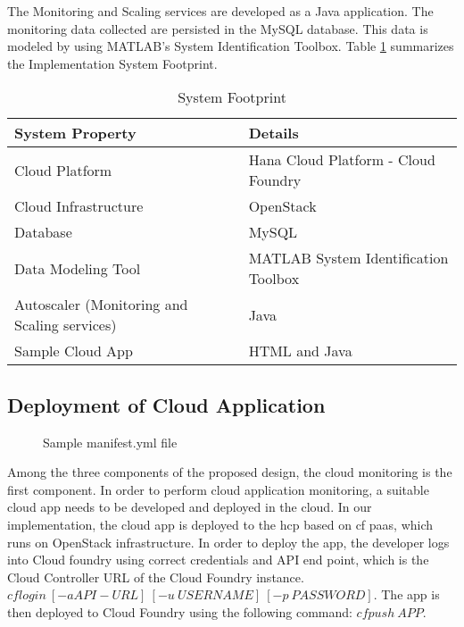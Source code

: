 \documentclass[article,type=msc,colorback,12pt,accentcolor=tud8b,table]{tudthesis}
\begin{document}
The Monitoring and Scaling services are developed as a Java application. The monitoring data collected are persisted in the MySQL database. This data is modeled by using MATLAB's System Identification Toolbox. Table \ref{tab:system_footprint} summarizes the Implementation System Footprint.

\begin{table}[H]
	\centering
	\caption{System Footprint}
	\label{tab:system_footprint}
	\begin{tabular}{|l|l|}
		\hline
		\rowcolor[HTML]{EC6500} 
		\textbf{System Property}  & \textbf{Details}                     \\ \hline
		Cloud Platform            & Hana Cloud Platform - Cloud Foundry  \\ \hline
		Cloud Infrastructure      & OpenStack                            \\ \hline
		Database                  & MySQL                                \\ \hline
		Data Modeling Tool        & MATLAB System Identification Toolbox \\ \hline
		Autoscaler (Monitoring and Scaling services) & Java                                 \\ \hline
		Sample Cloud App          & HTML and Java                        \\ \hline
	\end{tabular}
\end{table}

 
	\subsection{Deployment of Cloud Application} 

 \begin{figure}[!h]
 	\begin{center}
 		\makebox[\textwidth]{\texttt{[image: D2]}}
 	\end{center}
 	\caption{Sample manifest.yml file}
 	\label{fig:sample_manifest}
 \end{figure}
	
	Among the three components of the proposed design, the cloud monitoring is the first component. In order to perform cloud application monitoring, a suitable cloud app needs to be developed and deployed in the cloud. In our implementation, the cloud app is deployed to the \gls{hcp} based on \gls{cf} \gls{paas}, which runs on OpenStack \cite{openstack} infrastructure. In order to deploy the app, the developer logs into Cloud foundry using correct credentials and API end point, which is the Cloud Controller URL of the Cloud Foundry instance. $ cf login \: [-a API-URL] \: [-u \: USERNAME] \: [-p \: PASSWORD] $. The app is then deployed to Cloud Foundry using the following command: $ cf push \: APP $.		
\end{document}
